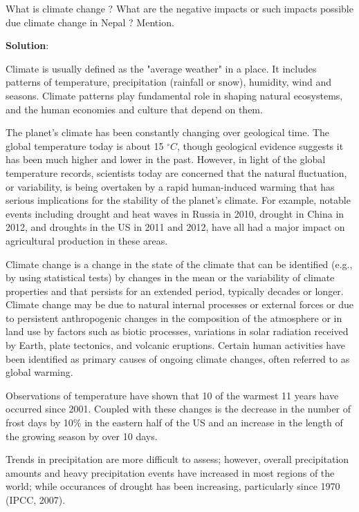 \documentclass[
  openany]{book}
\newcommand{\question}{\item}
\newenvironment{solution}{ {\bfseries Solution}:}{}
\begin{document}
\begin{questions}
\question What is climate change ? What are the negative impacts or such impacts possible due climate change in Nepal ? Mention.

\begin{solution}

Climate is usually defined as the "average weather" in a place. It includes patterns of temperature, precipitation (rainfall or snow), humidity, wind and seasons. Climate patterns play fundamental role in shaping natural ecosystems, and the human economies and culture that depend on them.

The planet's climate has been constantly changing over geological time. The global temperature today is about 15 $^\circ C$, though geological evidence suggests it has been much higher and lower in the past. However, in light of the global temperature records, scientists today are concerned that the natural fluctuation, or variability, is being overtaken by a rapid human-induced warming that has serious implications for the stability of the planet's climate. For example, notable events including drought and heat waves in Russia in 2010, drought in China in 2012, and droughts in the US in 2011 and 2012, have all had a major impact on agricultural production in these areas.

Climate change is a change in the state of the climate that can be identified (e.g., by using statistical tests) by changes in the mean or the variability of climate properties and that persists for an extended period, typically decades or longer. Climate change may be due to natural internal processes or external forces or due to persistent anthropogenic changes in the composition of the atmosphere or in land use by factors such as biotic processes, variations in solar radiation received by Earth, plate tectonics, and volcanic eruptions. Certain human activities have been identified as primary causes of ongoing climate changes, often referred to as global warming.

Observations of temperature have shown that 10 of the warmest 11 years have occurred since 2001. Coupled with these changes is the decrease in the number of frost days by 10\% in the eastern half of the US and an increase in the length of the growing season by over 10 days.

Trends in precipitation are more difficult to assess; however, overall precipitation amounts and heavy precipitation events have increased in most regions of the world; while occurances of drought has been increasing, particularly since 1970 (IPCC, 2007). 


\end{solution}
\end{questions}
\end{document}
